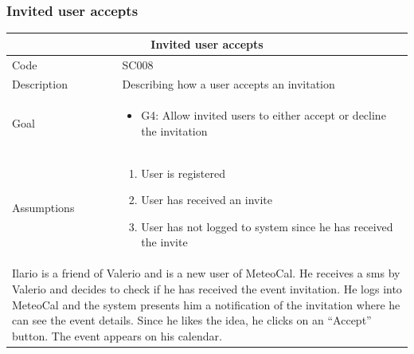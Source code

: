 \documentclass[10pt,a4paper,titlepage]{article}
\begin{document}
\subsubsection{Invited user accepts}
\begin{tabular}{| p{3cm} | p{10cm} |}
\hline \multicolumn{2}{|c|}{\textbf{Invited user accepts}} \\ 
\hline Code & SC008 \\ 
\hline Description & Describing how a user accepts an invitation \\
\hline Goal & \begin{itemize}\item G4: Allow invited users to either accept or decline the invitation \end{itemize}\\
\hline Assumptions & \begin{enumerate}
\item User is registered
\item User has received an invite
\item User has not logged to system since he has received the invite
\end{enumerate} \\
\hline \multicolumn{2}{|p{13cm}|}{Ilario is a friend of Valerio and is a new user of MeteoCal. He receives a sms by Valerio and decides to check if he has received the event invitation. He logs into MeteoCal and the system presents him a notification of the invitation where he can see the event details. Since he likes the idea, he clicks on an “Accept” button. The event appears on his calendar.}\\
\hline
\end{tabular}
\end{document}
